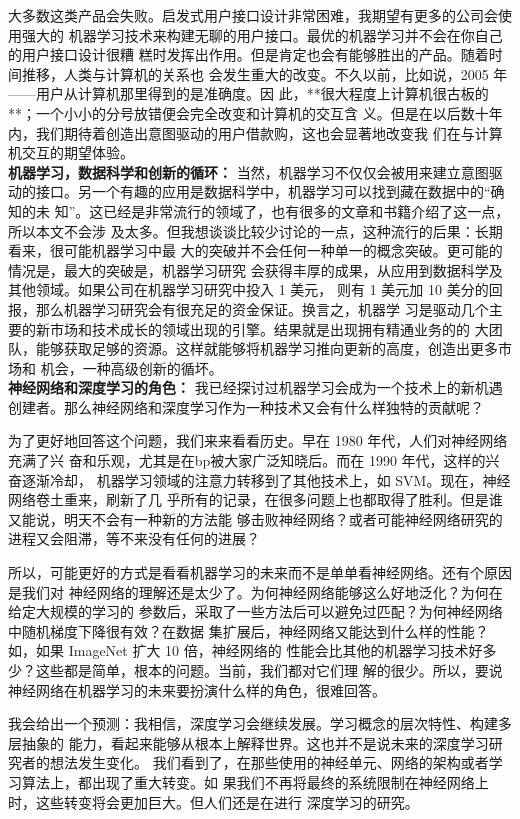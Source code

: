 大多数这类产品会失败。启发式用户接口设计非常困难，我期望有更多的公司会使用强大的
机器学习技术来构建无聊的用户接口。最优的机器学习并不会在你自己的用户接口设计很糟
糕时发挥出作用。但是肯定也会有能够胜出的产品。随着时间推移，人类与计算机的关系也
会发生重大的改变。不久以前，比如说，2005 年——用户从计算机那里得到的是准确度。因
此，**很大程度上计算机很古板的**；一个小小的分号放错便会完全改变和计算机的交互含
义。但是在以后数十年内，我们期待着创造出意图驱动的用户借款购，这也会显著地改变我
们在与计算机交互的期望体验。\\

\textbf{机器学习，数据科学和创新的循环：} 当然，机器学习不仅仅会被用来建立意图驱
动的接口。另一个有趣的应用是数据科学中，机器学习可以找到藏在数据中的“确知的未
知”。这已经是非常流行的领域了，也有很多的文章和书籍介绍了这一点，所以本文不会涉
及太多。但我想谈谈比较少讨论的一点，这种流行的后果：长期看来，很可能机器学习中最
大的突破并不会任何一种单一的概念突破。更可能的情况是，最大的突破是，机器学习研究
会获得丰厚的成果，从应用到数据科学及其他领域。如果公司在机器学习研究中投入 1 美元，
则有 1 美元加 10 美分的回报，那么机器学习研究会有很充足的资金保证。换言之，机器学
习是驱动几个主要的新市场和技术成长的领域出现的引擎。结果就是出现拥有精通业务的的
大团队，能够获取足够的资源。这样就能够将机器学习推向更新的高度，创造出更多市场和
机会，一种高级创新的循坏。\\

\textbf{神经网络和深度学习的角色：} 我已经探讨过机器学习会成为一个技术上的新机遇
创建者。那么神经网络和深度学习作为一种技术又会有什么样独特的贡献呢？

为了更好地回答这个问题，我们来来看看历史。早在 1980 年代，人们对神经网络充满了兴
奋和乐观，尤其是在\gls*{bp}被大家广泛知晓后。而在 1990 年代，这样的兴奋逐渐冷却，
机器学习领域的注意力转移到了其他技术上，如 SVM。现在，神经网络卷土重来，刷新了几
乎所有的记录，在很多问题上也都取得了胜利。但是谁又能说，明天不会有一种新的方法能
够击败神经网络？或者可能神经网络研究的进程又会阻滞，等不来没有任何的进展？

所以，可能更好的方式是看看机器学习的未来而不是单单看神经网络。还有个原因是我们对
神经网络的理解还是太少了。为何神经网络能够这么好地泛化？为何在给定大规模的学习的
参数后，采取了一些方法后可以避免过匹配？为何神经网络中随机梯度下降很有效？在数据
集扩展后，神经网络又能达到什么样的性能？如，如果 ImageNet 扩大 10 倍，神经网络的
性能会比其他的机器学习技术好多少？这些都是简单，根本的问题。当前，我们都对它们理
解的很少。所以，要说神经网络在机器学习的未来要扮演什么样的角色，很难回答。

我会给出一个预测：我相信，深度学习会继续发展。学习概念的层次特性、构建多层抽象的
能力，看起来能够从根本上解释世界。这也并不是说未来的深度学习研究者的想法发生变化。
我们看到了，在那些使用的神经单元、网络的架构或者学习算法上，都出现了重大转变。如
果我们不再将最终的系统限制在神经网络上时，这些转变将会更加巨大。但人们还是在进行
深度学习的研究。\\

